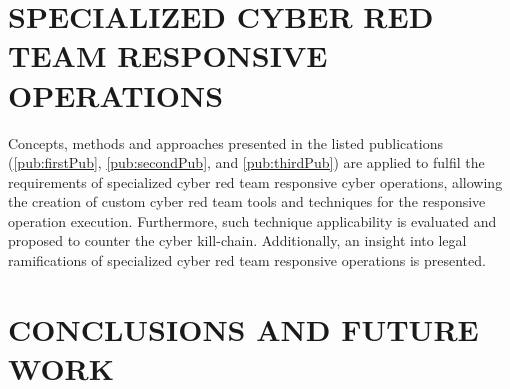 




\section{SPECIALIZED CYBER RED TEAM RESPONSIVE OPERATIONS}
\label{sec:crtops}
\glsresetall
Concepts, methods and approaches presented in the listed publications (\ref{pub:firstPub}, \ref{pub:secondPub}, and \ref{pub:thirdPub}) are applied to fulfil the requirements of specialized cyber red team responsive cyber operations, allowing the creation of custom cyber red team tools and techniques for the responsive operation execution. Furthermore, such technique applicability is evaluated and proposed to counter the cyber kill-chain. Additionally, an insight into legal ramifications of specialized cyber red team responsive operations is presented.








\section{CONCLUSIONS AND FUTURE WORK}
\label{sec:end}
\glsresetall
